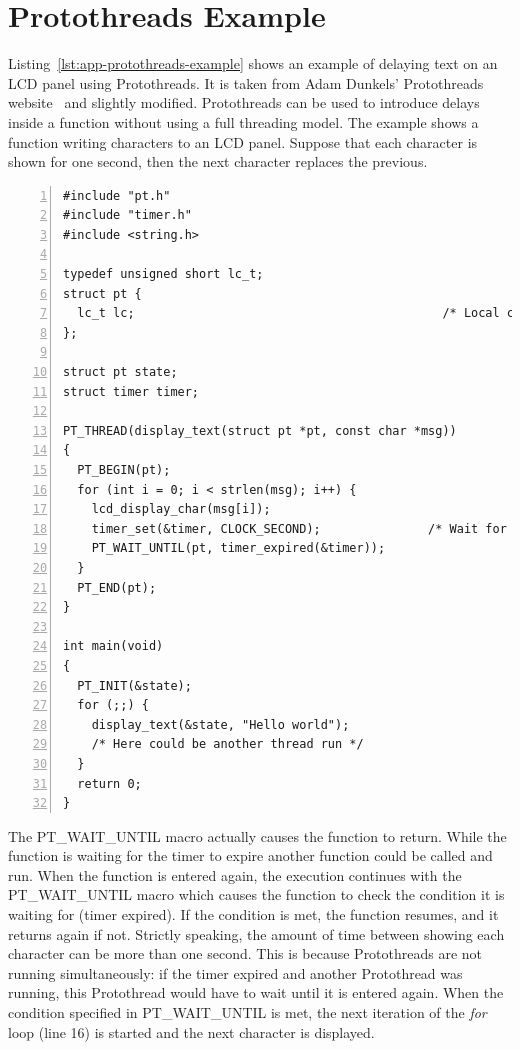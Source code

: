
\chapter{Protothreads Example}\label{app:protothreads}
Listing~\ref{lst:app-protothreads-example} shows
an example of delaying text on an LCD panel using Protothreads.
It is taken from
Adam Dunkels' Protothreads website~\cite{adam-protothreads} and slightly modified.
Protothreads can be used to introduce delays inside a function without using a full threading model.
The example shows a function writing characters to an LCD panel.
Suppose that each character is shown for one second, then the next character replaces the previous.
\begin{lstlisting}[numbers=left,caption={Example using Protothreads},label=lst:app-protothreads-example]
#include "pt.h"
#include "timer.h"
#include <string.h>

typedef unsigned short lc_t;
struct pt {
  lc_t lc;                                           /* Local continuation */
};

struct pt state;
struct timer timer;

PT_THREAD(display_text(struct pt *pt, const char *msg))
{
  PT_BEGIN(pt);
  for (int i = 0; i < strlen(msg); i++) {
    lcd_display_char(msg[i]);
    timer_set(&timer, CLOCK_SECOND);               /* Wait for one second. */
    PT_WAIT_UNTIL(pt, timer_expired(&timer));
  }
  PT_END(pt);
}

int main(void)
{
  PT_INIT(&state);
  for (;;) {
    display_text(&state, "Hello world");
    /* Here could be another thread run */
  }
  return 0;
}
\end{lstlisting}
The PT\_WAIT\_UNTIL macro actually causes the function to return.
While the function is waiting for the timer to expire another function could be called and run.
When the function is entered again, the execution continues with the PT\_WAIT\_UNTIL macro
which causes the function to check the condition it is waiting for (timer expired).
If the condition is met, the function resumes, and it returns again if not.
Strictly speaking, the amount of time between showing each character can
be more than one second.
This is because Protothreads are not running simultaneously: if the timer expired
and another Protothread was running, this Protothread would have to wait until
it is entered again.
When the condition specified in PT\_WAIT\_UNTIL is met,
the next iteration of the {\it{for}} loop (line 16) is started and the next character is displayed.

